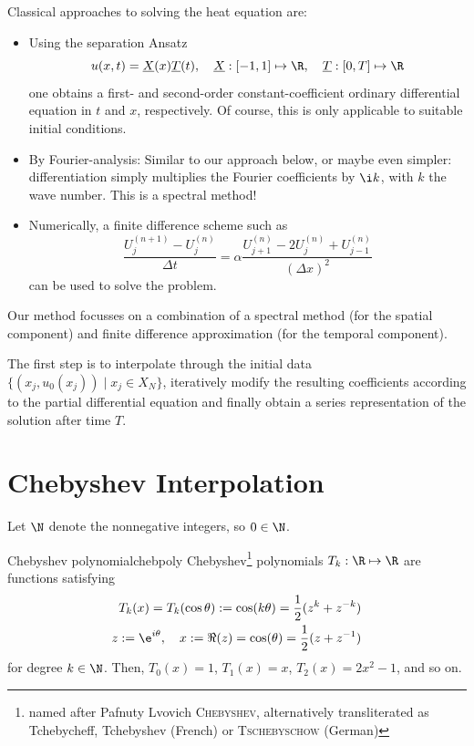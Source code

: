 \documentclass[12pt, a4paper]{article}
\begin{document}
  Classical approaches to solving the heat equation are:
  \begin{itemize}
    \item Using the separation Ansatz
          $$u(x, t) = \underline{X}(x) \underline{T}(t), \quad \underline{X}: [-1, 1] \mapsto \R, \quad \underline{T}: [0, T] \mapsto \R$$
          one obtains a first- and second-order constant-coefficient ordinary differential equation in $t$ and $x$, respectively. Of course, this is only applicable to suitable initial conditions.

    \item By Fourier-analysis: Similar to our approach below, or maybe even simpler: differentiation simply multiplies the Fourier coefficients by $\i k$, with $k$ the wave number. This is a spectral method!

    \item Numerically, a finite difference scheme such as
          $$\frac{U_{j}^{(n+1)} - U_{j}^{(n)}}{\Delta t} = \alpha \frac{U_{j+1}^{(n)} - 2 U_{j}^{(n)} + U_{j-1}^{(n)}}{(\Delta x)^2}$$ can be used to solve the problem.
  \end{itemize}

  Our method focusses on a combination of a spectral method (for the spatial component) and finite difference approximation (for the temporal component).

  The first step is to interpolate through the initial data $\{(x_j, u_0(x_j)) \;|\; x_j \in X_N\}$, iteratively modify the resulting coefficients according to the partial differential equation and finally obtain a series representation of the solution after time $T$.

  \pagebreak
  \section{Chebyshev Interpolation}
  Let $\N$ denote the nonnegative integers, so $0 \in \N$.

  \begin{definition}{Chebyshev polynomial}{chebpoly}
    Chebyshev\footnote{named after Pafnuty Lvovich \textsc{Chebyshev}, alternatively transliterated as Tchebycheff, Tchebyshev (French) or \textsc{Tschebyschow} (German)} polynomials $T_k: \R \mapsto \R$ are functions satisfying
    \begin{align*}
      T_k(x) = T_k(\cos \theta) := \cos(k \theta) = \frac{1}{2} (z^k + z^{-k}) \\
      z := \e^{i \theta},\quad x := \Re(z) = \cos(\theta) = \frac{1}{2}(z + z^{-1})
    \end{align*}
    for degree $k \in \N$. Then, $T_0(x) = 1$, $T_1(x) = x$, $T_2(x) = 2x^2-1$, and so on.
  \end{definition}
\end{document}
